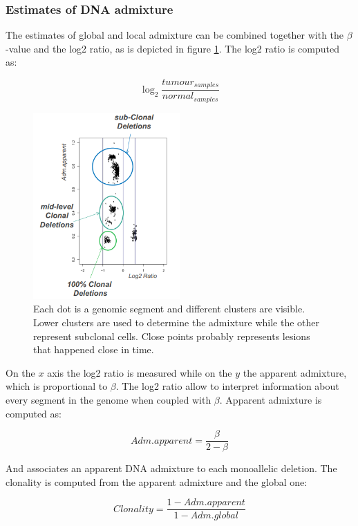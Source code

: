 		\subsubsection{Estimates of DNA admixture}
		The estimates of global and local admixture can be combined together with the $\beta$-value and the log2 ratio, as is depicted in figure \ref{fig:2D}.
		The log2 ratio is computed as:

		$$\log_2\frac{tumour_{samples}}{normal_{samples}}$$

		\begin{figure}[H]
			\centering
			\includegraphics[width=0.5\textwidth]{adm.png}
			\caption{Each dot is a genomic segment and different clusters are visible. Lower clusters are used to determine the admixture while the other represent subclonal cells. Close points probably represents lesions that happened close in time.}
			\label{fig:2D}
		\end{figure}

		On the $x$ axis the log2 ratio is measured while on the $y$ the apparent admixture, which is proportional to $\beta$.
		The log2 ratio allow to interpret information about every segment in the genome when coupled with $\beta$.
		Apparent admixture is computed as:

		$$Adm.apparent = \frac{\beta}{2-\beta}$$

		And associates an apparent DNA admixture to each monoallelic deletion.
		The clonality is computed from the apparent admixture and the global one:

		$$Clonality = \frac{1-Adm.apparent}{1-Adm.global}$$

